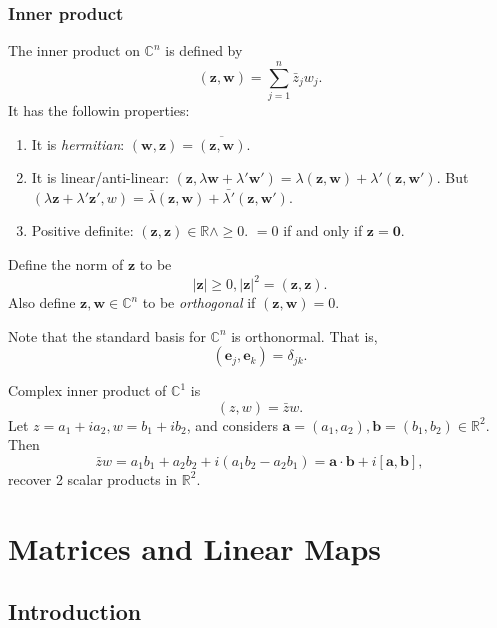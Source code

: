 \documentclass[a4paper]{article}
\begin{document}
\subsubsection{Inner product}
The inner product on $ \mathbb{C}^{n} $ is defined by
\[
  (\mathbf{z},\mathbf{w})=\sum_{j=1}^n \bar{z}_j w_j
.\]
It has the followin properties:
\begin{enumerate}[(1)]
  \item It is \textit{hermitian}: $
    (\mathbf{w},\mathbf{z})=\overline{(\mathbf{z},\mathbf{w})} $.
  \item It is linear/anti-linear: $ (\mathbf{z}, \lambda \mathbf{w}
      +\lambda'
    \mathbf{w}')=\lambda(\mathbf{z},\mathbf{w})+\lambda'(\mathbf{z},\mathbf{w}')
    $. But $ (\lambda \mathbf{z}+\lambda'
    \mathbf{z}',w)=\bar{\lambda}(\mathbf{z},\mathbf{w})+\bar{\lambda'}(\mathbf{z},\mathbf{w}')
    $.
  \item Positive definite: $ (\mathbf{z},\mathbf{z})\in \mathbb{R}
    \land \ge 0 $. $ =0 $ if and only if $ \mathbf{z}=\mathbf{0} $.
\end{enumerate}
Define the norm of $ \mathbf{z} $ to be
\[
  \left| \mathbf{z} \right| \ge 0, |\mathbf{z}|^2=(\mathbf{z},\mathbf{z})
.\]
Also define $ \mathbf{z}, \mathbf{w}\in \mathbb{C}^{n} $ to be
\textit{orthogonal} if $ (\mathbf{z},\mathbf{w})=0. $

Note that the standard basis for $ \mathbb{C}^{n} $ is orthonormal. That is,
\[
  (\mathbf{e}_j,\mathbf{e}_k)=\delta_{jk}
.\]
\begin{example}
  Complex inner product of $ \mathbb{C}^{1} $ is
  \[
    (z,w)=\bar{z}w
  .\]
  Let $ z=a_1+ia_2,w=b_1+ib_2 $, and considers $
  \mathbf{a}=(a_1,a_2),\mathbf{b}=(b_1,b_2)\in \mathbb{R}^{2} $. Then
  \[
    \bar{z}w=a_1b_1+a_2b_2+i(a_1b_2-a_2b_1)=\mathbf{a}\cdot
    \mathbf{b}+i[\mathbf{a},\mathbf{b}]
  ,\]
  recover 2 scalar products in $ \mathbb{R}^2 $.
\end{example}\newpage
\section{Matrices and Linear Maps}
\subsection{Introduction}
\end{document}

